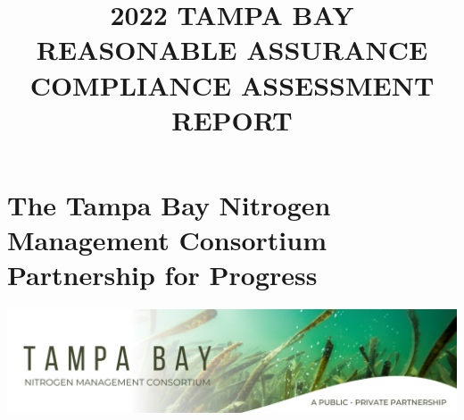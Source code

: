 \documentclass[
  letterpaper,
  DIV=11,
  numbers=noendperiod]{scrreprt}
\title{2022 TAMPA BAY REASONABLE ASSURANCE COMPLIANCE ASSESSMENT REPORT}
\author{}
\date{}
\renewcommand*\contentsname{Table of contents}
\newcommand\contentsname{Table of contents}
\begin{document}
\maketitle
\ifdefined\Shaded\renewenvironment{Shaded}{\begin{tcolorbox}[sharp corners, boxrule=0pt, enhanced, borderline west={3pt}{0pt}{shadecolor}, interior hidden, breakable, frame hidden]}{\end{tcolorbox}}\fi

\renewcommand*\contentsname{Table of contents}
{
\hypersetup{linkcolor=}
\setcounter{tocdepth}{2}
\tableofcontents
}

\hypertarget{the-tampa-bay-nitrogen-management-consortium-partnership-for-progress}{%
\chapter{The Tampa Bay Nitrogen Management Consortium Partnership for
Progress}\label{the-tampa-bay-nitrogen-management-consortium-partnership-for-progress}}

\includegraphics{./www/header.png}
\end{document}
